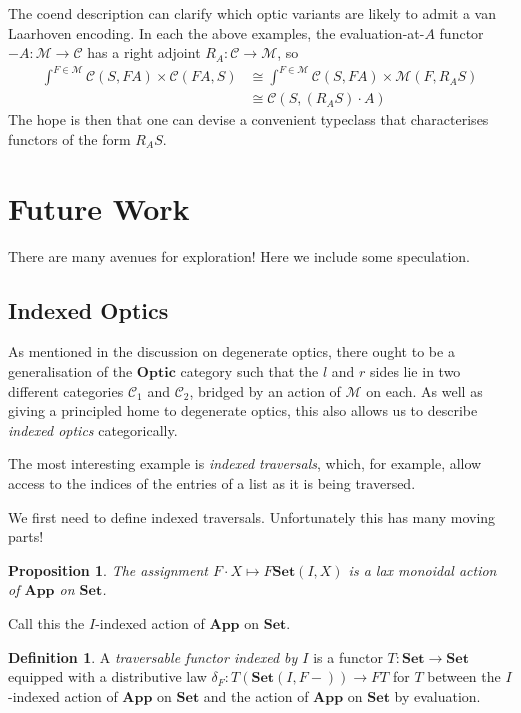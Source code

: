 \documentclass[11pt,letterpaper]{article}
\theoremstyle{plain}
\newtheorem{proposition}[theorem]{Proposition}
\theoremstyle{definition}
\newtheorem{definition}[theorem]{Definition}
\newcommand{\C}{\mathscr{C}}
\newcommand{\M}{\mathscr{M}}
\newcommand{\Set}{\mathbf{Set}}
\newcommand{\App}{\mathbf{App}}
\newcommand{\Optic}{\mathbf{Optic}}
\begin{document}
The coend description can clarify which optic variants are likely to admit a van Laarhoven encoding. In each the above examples, the evaluation-at-$A$ functor $-A : \M \to \C$ has a right adjoint $R_A : \C \to \M$, so
\begin{align*}
\int^{F \in \M} \C(S, FA) \times \C(FA, S)
&\cong \int^{F \in \M} \C(S, FA) \times \M(F, R_A S) \\
&\cong \C(S,  (R_A S) \cdot A)
\end{align*}
The hope is then that one can devise a convenient typeclass that characterises functors of the form $R_A S$.

\section{Future Work}

There are many avenues for exploration! Here we include some speculation.

\subsection{Indexed Optics}
As mentioned in the discussion on degenerate optics, there ought to be a generalisation of the $\Optic$ category such that the $l$ and $r$ sides lie in two different categories $\C_1$ and $\C_2$, bridged by an action of $\M$ on each. As well as giving a principled home to degenerate optics, this also allows us to describe \emph{indexed optics} categorically.

The most interesting example is \emph{indexed traversals}, which, for example, allow access to the indices of the entries of a list as it is being traversed.

We first need to define indexed traversals. Unfortunately this has many moving parts!

\begin{proposition}
The assignment $F \cdot X \mapsto F \Set(I, X)$ is a lax monoidal action of $\App$ on $\Set$.
\end{proposition}
Call this the $I$-indexed action of $\App$ on $\Set$.

\begin{definition}
A \emph{traversable functor indexed by $I$} is a functor $T : \Set \to \Set$ equipped with a distributive law $\delta_F : T(\Set(I, F-)) \to FT$ for $T$ between the $I$-indexed action of $\App$ on $\Set$ and the action of $\App$ on $\Set$ by evaluation.
\end{definition}
\end{document}
